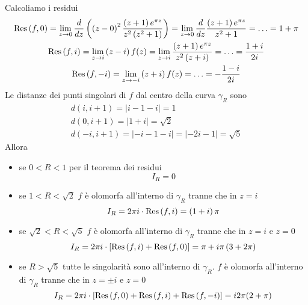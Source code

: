 Calcoliamo i residui
\begin{gather*}
\operatorname{Res} \left(f, 0\right) = \lim_{z\rightarrow 0}\frac{d}{dz}\left(\left(z - 0\right)^{2}\frac{\left(z + 1\right) e^{\pi z}}{z^{2}\left(z^{2} + 1\right)}\right) = \lim_{z\rightarrow 0}\frac{d}{dz}\frac{\left(z + 1\right) e^{\pi z}}{z^{2} + 1} = \dotsc = 1 + \pi \\
\operatorname{Res} \left(f, i\right) = \lim_{z\rightarrow i}\left(z - i\right) f(z) = \lim_{z\rightarrow i}\frac{\left(z + 1\right) e^{\pi z}}{z^{2}\left(z + i\right)} = \dotsc = \frac{1 + i}{2i}\\
\operatorname{Res} \left(f, - i\right) = \lim_{z\rightarrow - i}\left(z + i\right) f(z) = \dotsc = - \frac{1 - i}{2i}
\end{gather*}
Le distanze dei punti singolari di $f$ dal centro della curva $\gamma_{R}$ sono
\begin{gather*}
d\left(i, i + 1\right) = \left| i - 1 - i\right| = 1\\
d\left(0, i + 1\right) = \left| 1 + i\right| = \sqrt{2}\\
d\left(- i, i + 1\right) = \left| - i - 1 - i\right| = \left| - 2i - 1\right| = \sqrt{5}
\end{gather*}
Allora
\begin{itemize}
\item se $0 < R < 1$ per il teorema dei residui
\begin{equation*}
I_{R} = 0
\end{equation*}
\item se $1 < R < \sqrt{2}$ $f$ è olomorfa all'interno di $\gamma_{R}$ tranne che in $z = i$
\begin{equation*}
I_{R} = 2\pi i \cdot \operatorname{Res} \left(f, i\right) = \left(1 + i\right) \pi 
\end{equation*}
\item se $\sqrt{2} < R < \sqrt{5}$ $f$ è olomorfa all'interno di $\gamma_{R}$ tranne che in $z = i$ e $z = 0$
\begin{equation*}
I_{R} = 2\pi i \cdot \left[\operatorname{Res} \left(f, i\right) + \operatorname{Res} \left(f, 0\right)\right] = \pi + i\pi \left(3 + 2\pi\right)
\end{equation*}
\item se $R > \sqrt{5}$ tutte le singolarità sono all'interno di $\gamma_{R}$. $f$ è olomorfa all'interno di $\gamma_{R}$ tranne che in $z = \pm i$ e $z = 0$
\begin{equation*}
I_{R} = 2\pi i \cdot \left[\operatorname{Res} \left(f, 0\right) + \operatorname{Res} \left(f, i\right) + \operatorname{Res} \left(f, - i\right)\right] = i2\pi (2 + \pi)
\end{equation*}
\end{itemize}

